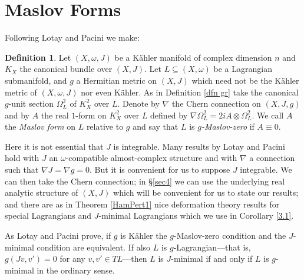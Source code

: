 \documentclass{article}
\theoremstyle{plain}%
\theoremstyle{definition}
\newtheorem{dfn}[thm]{Definition}
\numberwithin{equation}{section}
\numberwithin{figure}{section}
\def\l{\label}
\def\={\equiv}
\def\om{\omega}
\def\Om{\Omega}
\def\ot{\otimes}
\def\nb{\nabla}
\def\sb{\subseteq}
\begin{document}
\section{Maslov Forms}\l{sec2.5}
Following Lotay and Pacini \cite{LP2} we make:
\begin{dfn}\l{Mdfn}
Let $(X,\om,J)$ be a K\"ahler manifold of complex dimension $n$
and $K_X$ the canonical bundle over $(X,J).$
Let $L\sb (X,\om)$ be a Lagrangian submanifold, and $g$ a Hermitian metric on $(X,J)$
which need not be the K\"ahler metric of $(X,\om,J)$ nor even K\"ahler.
As in Definition \ref{dfn gr} take the canonical $g$-unit section $\Om_L^2$ of $K_X^2$ over $L.$
Denote by $\nb$ the Chern connection on $(X,J,g)$
and by $A$ the real $1$-form on $K_X^2$ over $L$ defined by
$\nb\Om_L^2=2iA\ot\Om_L^2.$
We call $A$ the {\it Maslov form} on $L$ relative to $g$
and say that $L$ is {\it $g$-Maslov-zero} if $A\=0.$
\end{dfn}
Here it is not essential that $J$ is integrable. Many results by Lotay and Pacini \cite{LP,LP2} hold with $J$ an $\om$-compatible almost-complex structure
and with $\nb$ a connection such that $\nb J=\nb g=0.$
But it is convenient for us to suppose $J$ integrable. We can then take the Chern connection; in \S\ref{sec4} we can use the underlying real analytic structure of $(X,J)$
which will be convenient for us to state our results; and there are as in Theorem \ref{HamPert1} nice deformation theory results for special Lagrangians and $J$-minimal Lagrangians which we use in Corollary \ref{3.1}.

As Lotay and Pacini \cite[Theorem 2.4]{LP} prove, if $g$ is K\"ahler the $g$-Maslov-zero condition and the $J$-minimal condition are equivalent.
If also $L$ is $g$-Lagrangian---that is, $g(Jv,v')=0$ for any
$v,v'\in TL$---then $L$ is $J$-minimal if and only if $L$ is $g$-minimal in the ordinary sense.
\end{document}
